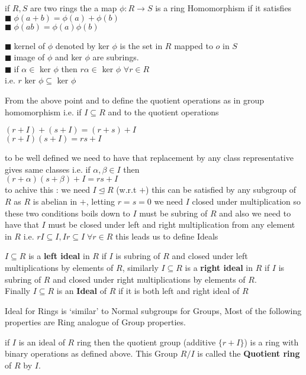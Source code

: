 \documentclass[11pt]{extarticle}
\newcommand{\ra}{\rightarrow}
\newcommand{\tbx}[2][]{
	\begin{tcolorbox}[enhanced,breakable,size=small,colback=black!2!white,title={#1},arc is angular, arc=1.5mm,drop fuzzy shadow]
		#2
	\end{tcolorbox}
}
\newcommand{\y}{$\blacksquare\;$}
\begin{document}
\begin{multicols}{2}
\tbx{if $ R,S $ are two rings the a map $ \phi :R \ra S $ is a ring Homomorphism if it satisfies
			\y $ \phi(a+b)=\phi(a)+\phi(b) $ \\
			\y $ \phi(ab)=\phi(a)\phi(b) $ \\
			} 
\tbx{\y kernel of $ \phi  $ denoted by ker $\phi $ is the set in $ R $ mapped to $ o $ in $ S $
\\
\y image of $ \phi $ and ker $\phi  $ are subrings.\\
\y if $\alpha\in   $ ker $ \phi $ then $ r\alpha \in  $ ker $ \phi $ $ \forall r \in R $\\
			i.e. $ r $ ker $ \phi \subseteq  $ ker $ \phi $
			} 
\tbx[Concept of Ideal]{From the above point and to define the quotient operations as in group homomorphism i.e. if  $ I \subseteq R $ and to the quotient operations 
			\begin{center}
				$ (r+I)+(s+I)=(r+s)+I $\\
				$ (r+I)(s+I)=rs+I $
			\end{center}
			to be well defined we need to have that replacement by any class representative gives same classes i.e.
			if $ \alpha, \beta \in I $ then \\
			$ (r+\alpha)(s+\beta)+I=rs+I $\\
			to achive this : we need $ I \trianglelefteq R $ (w.r.t $ + $) this can be satisfied by any subgroup of $ R $ as $ R $ is abelian in $ + $, letting $ r=s=0 $ we need $ I $ closed under multiplication so these two conditions boils down to $ I $ must be subring of $ R $ 
			and also we need to have that $ I $ must be closed under left and right multiplication from any element in $ R $
			i.e. $ rI \subseteq I, Ir\subseteq I \; \forall r\in R $ this leads us to define Ideals
			} 
\tbx{$I \subseteq R  $ is a \textbf{left ideal} in $ R $ if $ I $ is subring of $ R $ and closed under left multiplications by elements of $ R $, similarly $I \subseteq R  $ is a \textbf{right ideal} in $ R $ if $ I $ is subring of $ R $ and closed under right multiplications by elements of $ R $.\\
			Finally $ I \subseteq R $ is an \textbf{Ideal }of $ R $ if it is both left and right ideal of $ R $
			} 
\tbx{Ideal for Rings is `similar' to Normal subgroups for Groups, Most of the following properties are Ring analogue of Group properties.
			} 
\tbx{ if $ I $ is an ideal of $ R $ ring then the quotient group (additive $ \{r+I\} $) is a ring with binary operations as defined above. This Group $ R/I $ is called the \textbf{Quotient ring} of $ R $ by $ I. $
}
\end{multicols}
\end{document}

